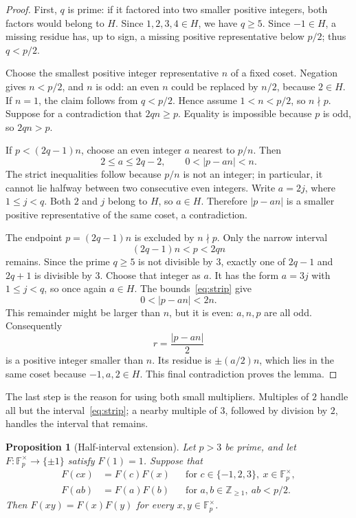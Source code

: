 \documentclass[11pt,a4paper]{article}
\newtheorem{proposition}[theorem]{Proposition}
\theoremstyle{remark}
\numberwithin{equation}{section}
\newcommand{\Fpx}{\mathbb F_p^{\times}}
\newcommand{\Z}{\mathbb Z}
\begin{document}
\begin{proof}
First, \(q\) is prime: if it factored into two smaller positive
integers, both factors would belong to \(H\). Since \(1,2,3,4\in H\),
we have \(q\ge5\). Since \(-1\in H\), a missing residue has, up to
sign, a missing positive representative below \(p/2\); thus \(q<p/2\).

Choose the smallest positive integer representative \(n\) of a fixed
coset. Negation gives \(n<p/2\), and \(n\) is odd: an even \(n\)
could be replaced by \(n/2\), because \(2\in H\). If \(n=1\), the
claim follows from \(q<p/2\). Hence assume \(1<n<p/2\), so
\(n\nmid p\). Suppose for a contradiction that \(2qn\ge p\).
Equality is impossible because \(p\) is odd, so \(2qn>p\).

If \(p<(2q-1)n\), choose an even integer \(a\) nearest to \(p/n\).
Then
\[
  2\le a\le2q-2,\qquad 0<|p-an|<n.
\]
The strict inequalities follow because \(p/n\) is not an integer;
in particular, it cannot lie halfway between two consecutive even
integers. Write \(a=2j\), where \(1\le j<q\). Both \(2\) and
\(j\) belong to \(H\), so \(a\in H\). Therefore \(|p-an|\) is a
smaller positive representative of the same coset, a contradiction.

The endpoint \(p=(2q-1)n\) is excluded by \(n\nmid p\). Only the narrow interval
\begin{equation}\label{eq:strip}
  (2q-1)n<p<2qn
\end{equation}
remains. Since the prime \(q\ge5\) is not divisible by \(3\), exactly
one of \(2q-1\) and \(2q+1\) is divisible by \(3\). Choose that
integer as \(a\). It has the form \(a=3j\) with \(1\le j<q\),
so once again \(a\in H\). The bounds~\eqref{eq:strip} give
\[
  0<|p-an|<2n.
\]
This remainder might be larger than \(n\), but it is even: \(a,n,p\)
are all odd. Consequently
\begin{equation}\label{eq:halved}
  r=\frac{|p-an|}{2}
\end{equation}
is a positive integer smaller than \(n\). Its residue is
\(\pm(a/2)n\), which lies in the same coset because
\(-1,a,2\in H\). This final contradiction proves the lemma.
\end{proof}

The last step is the reason for using both small multipliers. Multiples
of \(2\) handle all but the interval~\eqref{eq:strip}; a nearby multiple
of \(3\), followed by division by \(2\), handles the interval that remains.

\begin{proposition}[Half-interval extension]\label{prop:extension}
Let \(p>3\) be prime, and let \(F:\Fpx\to\{\pm1\}\) satisfy
\(F(1)=1\). Suppose that
\begin{align}
  F(cx)&=F(c)F(x)&&\text{for }c\in\{-1,2,3\},\ x\in\Fpx,
    \label{eq:small-exact}\\
  F(ab)&=F(a)F(b)&&\text{for }a,b\in\Z_{\ge1},\ ab<p/2.
    \label{eq:short-F}
\end{align}
Then \(F(xy)=F(x)F(y)\) for every \(x,y\in\Fpx\).
\end{proposition}
\end{document}
